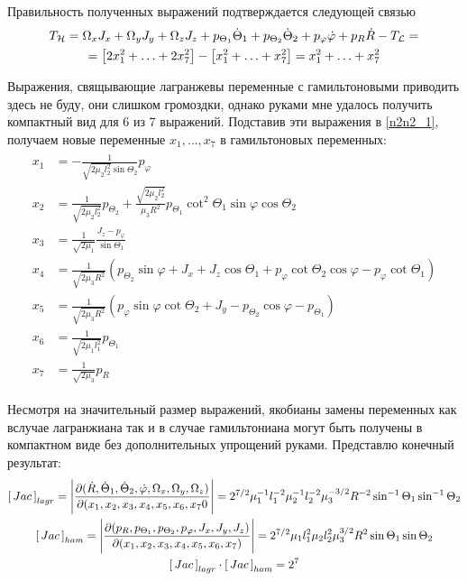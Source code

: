 \documentclass[12pt]{article}
\newcommand{\lb}{\left(}
\newcommand{\rb}{\right)}
\newcommand{\mL}{\mathcal{L}}
\newcommand{\mH}{\mathcal{H}}
\newcommand{\dR}{\dot{R}}
\newcommand{\JacL}{\left[ \, Jac \, \right]_{lagr}}
\newcommand{\JacH}{\left[ \, Jac \, \right]_{ham}}
\newcommand{\dtone}{\dot{\Theta}_1}
\newcommand{\dttwo}{\dot{\Theta}_2}
\newcommand{\ptone}{p_{\Theta_1}}
\newcommand{\pttwo}{p_{\Theta_2}}
\newcommand{\pphi}{p_{\varphi}}
\begin{document}
Правильность полученных выражений подтверждается следующей связью
\begin{gather}
		T_\mH = \Omega_x J_x + \Omega_y J_y + \Omega_z J_z + \ptone \dtone + \pttwo \dttwo + \pphi \dot{\varphi} + p_R \dot{R} - T_\mL = \notag \\
	= \left[ 2 x_1 ^2 + \ldots + 2 x_7^2 \right] - \left[ x_1^2 + \ldots + x_7^2 \right] = x_1^2 + \ldots + x_7^2 \notag
\end{gather}

Выражения, свящывающие лагранжевы переменные с гамильтоновыми приводить здесь не буду, они слишком громоздки, однако руками мне удалось получить компактный вид для 6 из 7 выражений. Подставив эти выражения в \eqref{n2n2_1}, получаем новые переменные $x_1, \ldots, x_7$ в гамильтоновых переменных:
\begin{gather}
	\begin{aligned}
		x_1 &= - \frac{1}{\sqrt{2 \mu_2 l_2^2} \sin \Theta_2} p_\varphi \\
		x_2 &= \frac{1}{\sqrt{2 \mu_2 l_2^2}} p_{\Theta_2} + \frac{\sqrt{2 \mu_2 l_2^2}}{\mu_3 R^2} p_{\Theta_1} \cot^2 \Theta_1 \sin \varphi \cos \Theta_2 \\
		x_3 &= \frac{1}{\sqrt{2 \mu_1}} \frac{J_z - p_\varphi}{\sin \Theta_1} \\
		x_4 &= \frac{1}{\sqrt{2 \mu_3 R^2}} \lb p_{\Theta_2} \sin \varphi + J_x + J_z \cos \Theta_1 + p_\varphi \cot \Theta_2 \cos \varphi - p_\varphi \cot \Theta_1 \rb \\
		x_5 &= \frac{1}{\sqrt{2 \mu_3 R^2}} \lb p_\varphi \sin \varphi \cot \Theta_2 + J_y - p_{\Theta_2} \cos \varphi - p_{\Theta_1} \rb \\
		x_6 &= \frac{1}{\sqrt{2 \mu_1 l_1^2}} p_{\Theta_1} \\
		x_7 &= \frac{1}{\sqrt{2 \mu_3}} p_R
	\end{aligned}
\end{gather}

Несмотря на значительный размер выражений, якобианы замены переменных как вслучае лагранжиана так и в случае гамильтониана могут быть получены в компактном виде без дополнительных упрощений руками. Представлю конечный результат:
\begin{gather}
		\JacL = \Bigg{|} \frac{\partial ( \dR, \dot{\Theta}_1, \dot{\Theta}_2, \dot{\varphi}, \Omega_x, \Omega_y, \Omega_z )}{\partial ( x_1, x_2, x_3, x_4, x_5, x_6, x_7 0} \Bigg{|} = 2^{7/2} \mu_1^{-1} l_1^{-2} \mu_2^{-1} l_2^{-2} \mu_3^{-3/2} R^{-2} \sin^{-1} \Theta_1 \sin^{-1} \Theta_2 \notag \\
		\JacH = \Bigg{|} \frac{\partial ( p_R, p_{\Theta_1}, p_{\Theta_2}, p_\varphi, J_x, J_y, J_z )}{\partial ( x_1, x_2, x_3, x_4, x_5, x_6, x_7) } \Bigg{|} = 2^{7/2} \mu_1 l_1^2 \mu_2 l_2^2 \mu_3^{3/2} R^2 \sin \Theta_1 \sin \Theta_2 \notag \\
		\JacL \cdot \JacH = 2^7 \notag
\end{gather}
\end{document}
